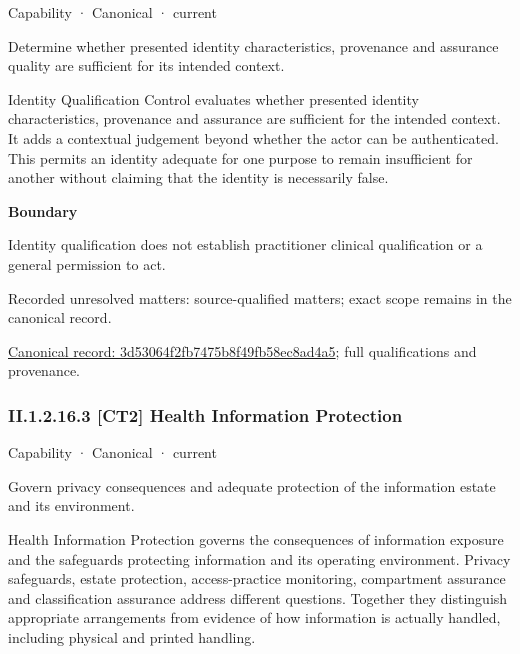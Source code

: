 \label{element:3d53064f2fb7475b8f49fb58ec8ad4a5}
{\small Capability · Canonical · current}\par

Determine whether presented identity characteristics, provenance and assurance quality are sufficient for its intended context.



Identity Qualification Control evaluates whether presented identity characteristics, provenance and assurance are sufficient for the intended context. It adds a contextual judgement beyond whether the actor can be authenticated. This permits an identity adequate for one purpose to remain insufficient for another without claiming that the identity is necessarily false.



\textbf{Boundary}



Identity qualification does not establish practitioner clinical qualification or a general permission to act.


{\small Recorded unresolved matters: source-qualified matters; exact scope remains in the canonical record.}\par
{\footnotesize \href{../../../../../../../continuum/strategy/capability/3d53064f2fb7475b8f49fb58ec8ad4a5.md}{Canonical record: 3d53064f2fb7475b8f49fb58ec8ad4a5}; full qualifications and provenance.}\par
\subsubsection*{II.1.2.16.3 [CT2] Health Information Protection}
\label{navigation:II.1.2.16.3}

\label{element:4ae0de8fa16840d09ab2ef3f5545a5e7}
{\small Capability · Canonical · current}\par

Govern privacy consequences and adequate protection of the information estate and its environment.



Health Information Protection governs the consequences of information exposure and the safeguards protecting information and its operating environment. Privacy safeguards, estate protection, access-practice monitoring, compartment assurance and classification assurance address different questions. Together they distinguish appropriate arrangements from evidence of how information is actually handled, including physical and printed handling.



